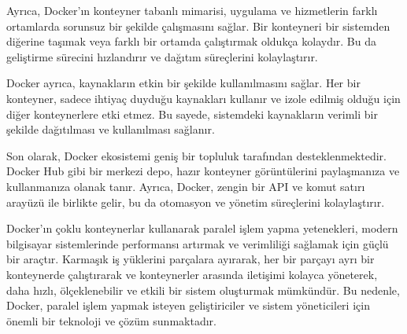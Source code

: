 Ayrıca, Docker'ın konteyner tabanlı mimarisi, uygulama ve hizmetlerin farklı ortamlarda sorunsuz bir şekilde çalışmasını sağlar. Bir konteyneri bir sistemden diğerine taşımak veya farklı bir ortamda çalıştırmak oldukça kolaydır. Bu da geliştirme sürecini hızlandırır ve dağıtım süreçlerini kolaylaştırır.

Docker ayrıca, kaynakların etkin bir şekilde kullanılmasını sağlar. Her bir konteyner, sadece ihtiyaç duyduğu kaynakları kullanır ve izole edilmiş olduğu için diğer konteynerlere etki etmez. Bu sayede, sistemdeki kaynakların verimli bir şekilde dağıtılması ve kullanılması sağlanır.

Son olarak, Docker ekosistemi geniş bir topluluk tarafından desteklenmektedir. Docker Hub gibi bir merkezi depo, hazır konteyner görüntülerini paylaşmanıza ve kullanmanıza olanak tanır. Ayrıca, Docker, zengin bir API ve komut satırı arayüzü ile birlikte gelir, bu da otomasyon ve yönetim süreçlerini kolaylaştırır.

Docker'ın çoklu konteynerlar kullanarak paralel işlem yapma yetenekleri, modern bilgisayar sistemlerinde performansı artırmak ve verimliliği sağlamak için güçlü bir araçtır. Karmaşık iş yüklerini parçalara ayırarak, her bir parçayı ayrı bir konteynerde çalıştırarak ve konteynerler arasında iletişimi kolayca yöneterek, daha hızlı, ölçeklenebilir ve etkili bir sistem oluşturmak mümkündür. Bu nedenle, Docker, paralel işlem yapmak isteyen geliştiriciler ve sistem yöneticileri için önemli bir teknoloji ve çözüm sunmaktadır.
